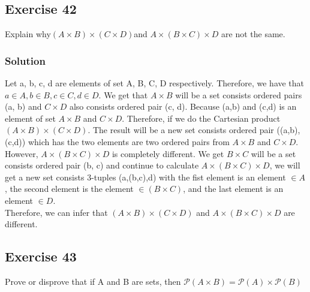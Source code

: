 \documentclass{article}
\theoremstyle{mytheoremstyle}
\theoremstyle{mytheoremstyle}
\theoremstyle{myproblemstyle}
\begin{document}
    \subsection*{Exercise 42}
        Explain why\((A\times B)\times(C\times D)\)and \(A\times(B\times C)\times D\) are not the same.
    \subsubsection*{Solution}
        Let a, b, c, d are elements of set A, B, C, D respectively. Therefore, we have that
        \(a \in A, b \in B, c \in C, d \in D\). We get that \(A \times B\) will be a set
        consists ordered pairs (a, b) and \(C \times D\) also consists ordered pair (c, d).
        Because (a,b) and (c,d) is an element of set \(A \times B\) and \(C \times D\).
        Therefore, if we do the Cartesian product \((A\times B)\times (C\times D)\). The result
        will be a new set consists ordered pair ((a,b),(c,d)) which has the two elements are
        two ordered pairs from \(A \times B\) and \(C \times D\).\\
        
        However, \(A \times (B\times C) \times D\) is completely different. We get \(B \times C\) will be a set consists ordered
        pair (b, c) and continue to calculate \(A \times (B \times C) \times D\), we will get a new set consists 3-tuples
        (a,(b,c),d) with the fist element is an element \(\in A\), the second element is the element \(\in (B \times C)\), and
        the last element is an element \(\in D\).\\

        Therefore, we can infer that \((A \times B)\times(C \times D)\) and \(A \times (B \times C)\times D\) are different.
    \subsection*{Exercise 43}
        Prove or disprove that if A and B are sets, then \(\mathcal{P}(A \times B) = \mathcal{P}(A) \times \mathcal{P}(B)\)
\end{document}
